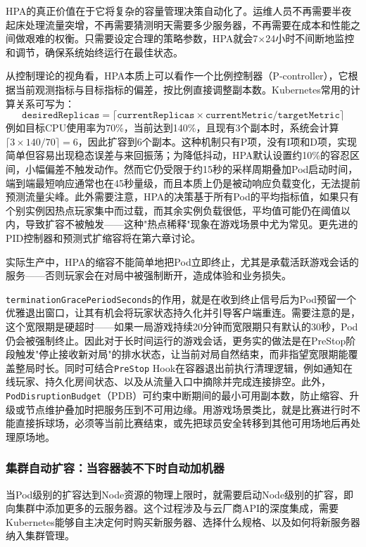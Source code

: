 HPA的真正价值在于它将复杂的容量管理决策自动化了。运维人员不再需要半夜起床处理流量突增，不再需要猜测明天需要多少服务器，不再需要在成本和性能之间做艰难的权衡。只需要设定合理的策略参数，HPA就会7×24小时不间断地监控和调节，确保系统始终运行在最佳状态。

从控制理论的视角看，HPA本质上可以看作一个比例控制器（P-controller），它根据当前观测指标与目标指标的偏差，按比例直接调整副本数。Kubernetes常用的计算关系可写为：
\[
\texttt{desiredReplicas}=\lceil \texttt{currentReplicas}\times \texttt{currentMetric}/\texttt{targetMetric}\rceil
\]
例如目标CPU使用率为70\%，当前达到140\%，且现有3个副本时，系统会计算$\lceil 3\times 140/70\rceil=6$，因此扩容到6个副本。这种机制只有P项，没有I项和D项，实现简单但容易出现稳态误差与来回振荡；为降低抖动，HPA默认设置约10\%的容忍区间，小幅偏差不触发动作。然而它仍受限于约15秒的采样周期叠加Pod启动时间，端到端最短响应通常也在45秒量级，而且本质上仍是被动响应负载变化，无法提前预测流量尖峰。此外需要注意，HPA的决策基于所有Pod的平均指标值，如果只有个别实例因热点玩家集中而过载，而其余实例负载很低，平均值可能仍在阈值以内，导致扩容不被触发——这种"热点稀释"现象在游戏场景中尤为常见。更先进的PID控制器和预测式扩缩容将在第六章讨论。

实际生产中，HPA的缩容不能简单地把Pod立即终止，尤其是承载活跃游戏会话的服务——否则玩家会在对局中被强制断开，造成体验和业务损失。

\texttt{terminationGracePeriodSeconds}的作用，就是在收到终止信号后为Pod预留一个优雅退出窗口，让其有机会将玩家状态持久化并引导客户端重连。需要注意的是，这个宽限期是硬超时——如果一局游戏持续20分钟而宽限期只有默认的30秒，Pod仍会被强制终止。因此对于长时间运行的游戏会话，更务实的做法是在PreStop阶段触发"停止接收新对局"的排水状态，让当前对局自然结束，而非指望宽限期能覆盖整局时长。同时可结合\texttt{PreStop} Hook在容器退出前执行清理逻辑，例如通知在线玩家、持久化房间状态、以及从流量入口中摘除并完成连接排空。此外，\texttt{PodDisruptionBudget}（PDB）可约束中断期间的最小可用副本数，防止缩容、升级或节点维护叠加时把服务压到不可用边缘。用游戏场景类比，就是比赛进行时不能直接拆球场，必须等当前比赛结束，或先把球员安全转移到其他可用场地后再处理原场地。

\subsubsection{集群自动扩容：当容器装不下时自动加机器}

当Pod级别的扩容达到Node资源的物理上限时，就需要启动Node级别的扩容，即向集群中添加更多的云服务器。这个过程涉及与云厂商API的深度集成，需要Kubernetes能够自主决定何时购买新服务器、选择什么规格、以及如何将新服务器纳入集群管理。

